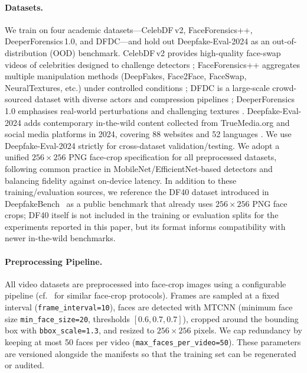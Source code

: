 \paragraph{Datasets.} We train on four academic datasets---CelebDF\,v2, FaceForensics++, DeeperForensics\,1.0, and DFDC---and hold out Deepfake\hyp Eval\hyp 2024 as an out\hyp of\hyp distribution (OOD) benchmark. CelebDF\,v2 provides high\hyp quality face\hyp swap videos of celebrities designed to challenge detectors \cite{li2020celebdf}; FaceForensics++ aggregates multiple manipulation methods (DeepFakes, Face2Face, FaceSwap, NeuralTextures, etc.) under controlled conditions \cite{rossler2019faceforensicspp}; DFDC is a large\hyp scale crowd\hyp sourced dataset with diverse actors and compression pipelines \cite{dolhansky2020dfdc}; DeeperForensics\,1.0 emphasises real\hyp world perturbations and challenging textures \cite{jiang2020deeperforensics}. Deepfake\hyp Eval\hyp 2024 adds contemporary in\hyp the\hyp wild content collected from TrueMedia.org and social media platforms in 2024, covering 88 websites and 52 languages \cite{deepeval2024}. We use Deepfake\hyp Eval\hyp 2024 strictly for cross\hyp dataset validation/testing.
We adopt a unified $256\times256$ PNG face\hyp crop specification for all preprocessed datasets, following common practice in MobileNet/EfficientNet\hyp based detectors and balancing fidelity against on\hyp device latency. In addition to these training/evaluation sources, we reference the DF40 dataset introduced in DeepfakeBench~\cite{zhang2024deepfakebench} as a public benchmark that already uses $256\times256$ PNG face crops; DF40 itself is not included in the training or evaluation splits for the experiments reported in this paper, but its format informs compatibility with newer in\hyp the\hyp wild benchmarks.

\paragraph{Preprocessing Pipeline.} All video datasets are preprocessed into face\hyp crop images using a configurable pipeline (cf.\ \cite{rossler2019faceforensicspp,li2020celebdf,jacob2017integeronly} for similar face\hyp crop protocols). Frames are sampled at a fixed interval (\verb|frame_interval=10|), faces are detected with MTCNN (minimum face size \verb|min_face_size=20|, thresholds \mbox{$[0.6,0.7,0.7]$}), cropped around the bounding box with \verb|bbox_scale=1.3|, and resized to $256\times256$ pixels. We cap redundancy by keeping at most 50 faces per video (\verb|max_faces_per_video=50|). These parameters are versioned alongside the manifests so that the training set can be regenerated or audited.

